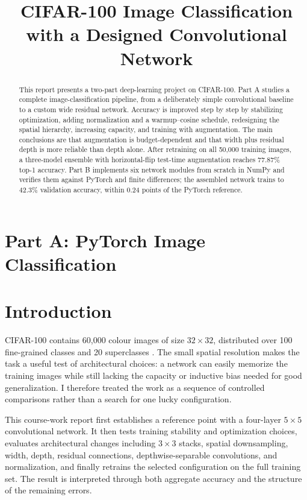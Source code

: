 \documentclass[10pt]{article}
\title{CIFAR-100 Image Classification with a Designed Convolutional Network}
\author{}
\date{}
\begin{document}
\maketitle

\begin{abstract}
This report presents a two-part deep-learning project on CIFAR-100. Part A studies a complete image-classification pipeline, from a deliberately simple convolutional baseline to a custom wide residual network. Accuracy is improved step by step by stabilizing optimization, adding normalization and a warmup--cosine schedule, redesigning the spatial hierarchy, increasing capacity, and training with augmentation. The main conclusions are that augmentation is budget-dependent and that width plus residual depth is more reliable than depth alone. After retraining on all 50,000 training images, a three-model ensemble with horizontal-flip test-time augmentation reaches 77.87\% top-1 accuracy. Part B implements six network modules from scratch in NumPy and verifies them against PyTorch and finite differences; the assembled network trains to 42.3\% validation accuracy, within 0.24 points of the PyTorch reference.
\end{abstract}

\section*{Part A: PyTorch Image Classification}
\setcounter{section}{0}
\renewcommand{\thesection}{A.\arabic{section}}

\section{Introduction}

CIFAR-100 contains 60,000 colour images of size $32\times32$, distributed over 100 fine-grained classes and 20 superclasses \cite{krizhevsky}. The small spatial resolution makes the task a useful test of architectural choices: a network can easily memorize the training images while still lacking the capacity or inductive bias needed for good generalization. I therefore treated the work as a sequence of controlled comparisons rather than a search for one lucky configuration.

This course-work report first establishes a reference point with a four-layer $5\times5$ convolutional network. It then tests training stability and optimization choices, evaluates architectural changes including $3\times3$ stacks, spatial downsampling, width, depth, residual connections, depthwise-separable convolutions, and normalization, and finally retrains the selected configuration on the full training set. The result is interpreted through both aggregate accuracy and the structure of the remaining errors.
\end{document}
